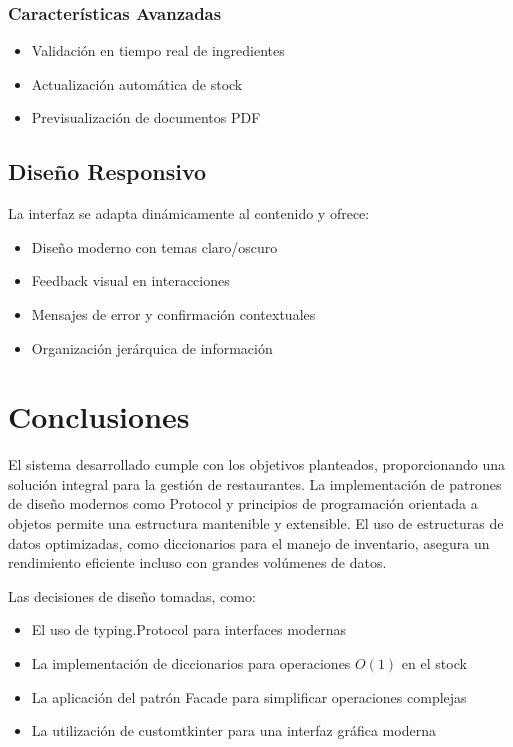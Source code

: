 \documentclass[12pt,letterpaper]{article}
\begin{document}
\subsubsection{Características Avanzadas}
\begin{itemize}
    \item Validación en tiempo real de ingredientes
    \item Actualización automática de stock
    \item Previsualización de documentos PDF
\end{itemize}

\subsection{Diseño Responsivo}
La interfaz se adapta dinámicamente al contenido y ofrece:
\begin{itemize}
    \item Diseño moderno con temas claro/oscuro
    \item Feedback visual en interacciones
    \item Mensajes de error y confirmación contextuales
    \item Organización jerárquica de información
\end{itemize}

\section{Conclusiones}
El sistema desarrollado cumple con los objetivos planteados, proporcionando una solución integral para la gestión de restaurantes. La implementación de patrones de diseño modernos como Protocol y principios de programación orientada a objetos permite una estructura mantenible y extensible. El uso de estructuras de datos optimizadas, como diccionarios para el manejo de inventario, asegura un rendimiento eficiente incluso con grandes volúmenes de datos.

Las decisiones de diseño tomadas, como:
\begin{itemize}
    \item El uso de typing.Protocol para interfaces modernas
    \item La implementación de diccionarios para operaciones $O(1)$ en el stock
    \item La aplicación del patrón Facade para simplificar operaciones complejas
    \item La utilización de customtkinter para una interfaz gráfica moderna
\end{itemize}
\end{document}
